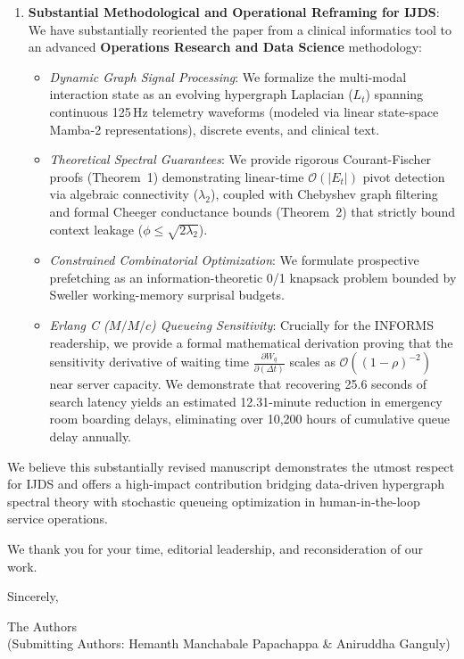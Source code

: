 \documentclass[11pt,letterpaper]{article}
\begin{document}
\begin{enumerate}
    \item \textbf{Substantial Methodological and Operational Reframing for IJDS}:
    We have substantially reoriented the paper from a clinical informatics tool to an advanced \textbf{Operations Research and Data Science} methodology:
    \begin{itemize}
        \item \emph{Dynamic Graph Signal Processing}: We formalize the multi-modal interaction state as an evolving hypergraph Laplacian ($L_t$) spanning continuous 125\,Hz telemetry waveforms (modeled via linear state-space Mamba-2 representations), discrete events, and clinical text.
        \item \emph{Theoretical Spectral Guarantees}: We provide rigorous Courant-Fischer proofs (Theorem~1) demonstrating linear-time $\mathcal{O}(|E_t|)$ pivot detection via algebraic connectivity ($\lambda_2$), coupled with Chebyshev graph filtering and formal Cheeger conductance bounds (Theorem~2) that strictly bound context leakage ($\phi \le \sqrt{2\lambda_2}$).
        \item \emph{Constrained Combinatorial Optimization}: We formulate prospective prefetching as an information-theoretic 0/1 knapsack problem bounded by Sweller working-memory surprisal budgets.
        \item \emph{Erlang C ($M/M/c$) Queueing Sensitivity}: Crucially for the INFORMS readership, we provide a formal mathematical derivation proving that the sensitivity derivative of waiting time $\frac{\partial W_q}{\partial (\Delta t)}$ scales as $\mathcal{O}((1-\rho)^{-2})$ near server capacity. We demonstrate that recovering 25.6 seconds of search latency yields an estimated 12.31-minute reduction in emergency room boarding delays, eliminating over 10,200 hours of cumulative queue delay annually.
    \end{itemize}
\end{enumerate}

We believe this substantially revised manuscript demonstrates the utmost respect for IJDS and offers a high-impact contribution bridging data-driven hypergraph spectral theory with stochastic queueing optimization in human-in-the-loop service operations. 

We thank you for your time, editorial leadership, and reconsideration of our work.

\vspace{14pt}

Sincerely,

\vspace{8pt}
The Authors\\
(Submitting Authors: Hemanth Manchabale Papachappa \& Aniruddha Ganguly)
\end{document}
